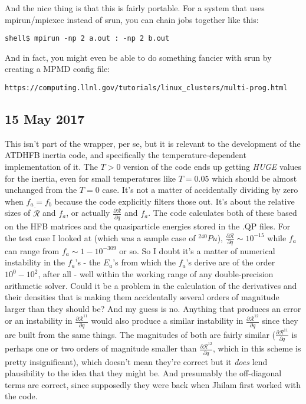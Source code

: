 And the nice thing is that this is fairly portable. For a system that uses mpirun/mpiexec instead of srun, you can chain jobs together like this:

\begin{verbatim}
shell$ mpirun -np 2 a.out : -np 2 b.out
\end{verbatim}

And in fact, you might even be able to do something fancier with srun by creating a MPMD config file:

\noindent\verb|https://computing.llnl.gov/tutorials/linux_clusters/multi-prog.html|

\subsection*{15 May 2017}

This isn't part of the wrapper, per se, but it is relevant to the development of the ATDHFB inertia code, and specifically the temperature-dependent implementation of it. The $T>0$ version of the code ends up getting \textit{HUGE} values for the inertia, even for small temperatures like $T=0.05$ which should be almost unchanged from the $T=0$ case. It's not a matter of accidentally dividing by zero when $f_a=f_b$ because the code explicitly filters those out. It's about the relative sizes of $\dot{\mathcal{R}}$ and $f_a$, or actually $\frac{\partial \mathcal{R}}{\partial q}$ and $f_a$. The code calculates both of these based on the HFB matrices and the quasiparticle energies stored in the .QP files. For the test case I looked at (which was a sample case of $^{240}Pu$), $\frac{\partial \mathcal{R}}{\partial q}\sim 10^{-15}$ while $f_a$ can range from $f_a \sim 1-10^{-309}$ or so. So I doubt it's a matter of numerical instability in the $f_a$'s - the $E_a$'s from which the $f_a$'s derive are of the order $10^0-10^2$, after all - well within the working range of any double-precision arithmetic solver. Could it be a problem in the calculation of the derivatives and their densities that is making them accidentally several orders of magnitude larger than they should be? And my guess is no. Anything that produces an error or an instability in $\frac{\partial \mathcal{R}^{11}}{\partial q}$ would also produce a similar instability in $\frac{\partial \mathcal{R}^{12}}{\partial q}$ since they are built from the same things. The magnitudes of both are fairly similar ($\frac{\partial \mathcal{R}^{11}}{\partial q}$ is perhaps one or two orders of magnitude smaller than $\frac{\partial \mathcal{R}^{12}}{\partial q}$, which in this scheme is pretty insignificant), which doesn't mean they're correct but it \textit{does} lend plausibility to the idea that they might be. And presumably the off-diagonal terms are correct, since supposedly they were back when Jhilam first worked with the code.

